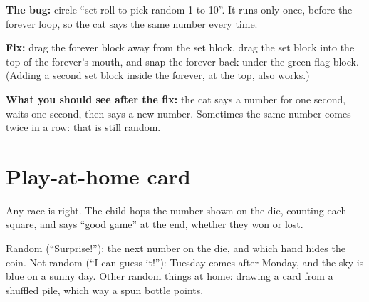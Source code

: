 \begin{answer}
\textbf{The bug:} circle \enquote{set roll to pick random 1 to 10}. It runs only once, before the forever loop, so the cat says the same number every time.

\textbf{Fix:} drag the forever block away from the set block, drag the set block into the top of the forever's mouth, and snap the forever back under the green flag block. (Adding a second set block inside the forever, at the top, also works.)

\textbf{What you should see after the fix:} the cat says a number for one second, waits one second, then says a new number. Sometimes the same number comes twice in a row: that is still random.
\end{answer}

\section{Play-at-home card}
\begin{answer}
Any race is right. The child hops the number shown on the die, counting each square, and says \enquote{good game} at the end, whether they won or lost.
\end{answer}

\begin{answer}
Random (\enquote{Surprise!}): the next number on the die, and which hand hides the coin. Not random (\enquote{I can guess it!}): Tuesday comes after Monday, and the sky is blue on a sunny day. Other random things at home: drawing a card from a shuffled pile, which way a spun bottle points.
\end{answer}
